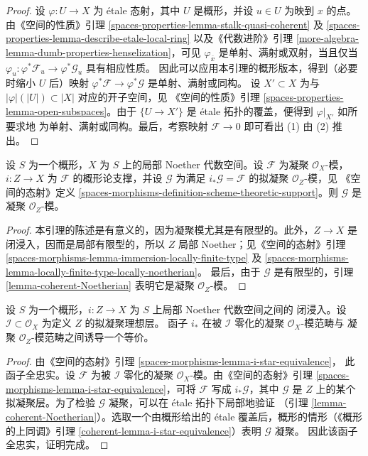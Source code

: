 \begin{proof}
设 $\varphi : U \to X$ 为 \'etale 态射，其中 $U$ 是概形，并设 $u \in U$
为映到 $x$ 的点。由《空间的性质》引理
\ref{spaces-properties-lemma-stalk-quasi-coherent} 及
\ref{spaces-properties-lemma-describe-etale-local-ring}
以及《代数进阶》引理
\ref{more-algebra-lemma-dumb-properties-henselization}，可见
$\varphi_{\overline{x}}$ 是单射、满射或双射，当且仅当
$\varphi_u : \varphi^*\mathcal{F}_u \to \varphi^*\mathcal{G}_u$
具有相应性质。%
因此可以应用本引理的概形版本，得到（必要时缩小 $U$ 后）映射
$\varphi^*\mathcal{F} \to \varphi^*\mathcal{G}$ 是单射、满射或同构。
设 $X' \subset X$ 为与 $|\varphi|(|U|) \subset |X|$ 对应的开子空间，见
《空间的性质》引理 \ref{spaces-properties-lemma-open-subspaces}。由于
$\{U \to X'\}$ 是 \'etale 拓扑的覆盖，便得到 $\varphi|_{X'}$ 如所要求地
为单射、满射或同构。最后，考察映射 $\mathcal{F} \to 0$ 即可看出 (1)
由 (2) 推出。
\end{proof}

\begin{lemma}
\label{lemma-coherent-support-closed}
设 $S$ 为一个概形，$X$ 为 $S$ 上的局部 Noether 代数空间。设
$\mathcal{F}$ 为凝聚 $\mathcal{O}_X$-模，$i : Z \to X$ 为
$\mathcal{F}$ 的概形论支撑，并设 $\mathcal{G}$ 为满足
$i_*\mathcal{G} = \mathcal{F}$ 的拟凝聚 $\mathcal{O}_Z$-模，见
《空间的态射》定义
\ref{spaces-morphisms-definition-scheme-theoretic-support}。则
$\mathcal{G}$ 是凝聚 $\mathcal{O}_Z$-模。
\end{lemma}

\begin{proof}
本引理的陈述是有意义的，因为凝聚模尤其是有限型的。此外，$Z \to X$
是闭浸入，因而是局部有限型的，所以 $Z$ 局部 Noether；见《空间的态射》引理
\ref{spaces-morphisms-lemma-immersion-locally-finite-type} 及
\ref{spaces-morphisms-lemma-locally-finite-type-locally-noetherian}。
最后，由于 $\mathcal{G}$ 是有限型的，引理
\ref{lemma-coherent-Noetherian} 表明它是凝聚 $\mathcal{O}_Z$-模。
\end{proof}

\begin{lemma}
\label{lemma-i-star-equivalence}
设 $S$ 为一个概形，$i : Z \to X$ 为 $S$ 上局部 Noether 代数空间之间的
闭浸入。设 $\mathcal{I} \subset \mathcal{O}_X$ 为定义 $Z$ 的拟凝聚理想层。
函子 $i_*$ 在被 $\mathcal{I}$ 零化的凝聚 $\mathcal{O}_X$-模范畴与
凝聚 $\mathcal{O}_Z$-模范畴之间诱导一个等价。
\end{lemma}

\begin{proof}
由《空间的态射》引理 \ref{spaces-morphisms-lemma-i-star-equivalence}，
此函子全忠实。设 $\mathcal{F}$ 为被 $\mathcal{I}$ 零化的凝聚
$\mathcal{O}_X$-模。由《空间的态射》引理
\ref{spaces-morphisms-lemma-i-star-equivalence}，可将
$\mathcal{F}$ 写成 $i_*\mathcal{G}$，其中 $\mathcal{G}$ 是 $Z$ 上的某个
拟凝聚层。为了检验 $\mathcal{G}$ 凝聚，可以在 \'etale 拓扑下局部地验证
（引理 \ref{lemma-coherent-Noetherian}）。选取一个由概形给出的 \'etale
覆盖后，概形的情形（《概形的上同调》引理
\ref{coherent-lemma-i-star-equivalence}）表明 $\mathcal{G}$ 凝聚。
因此该函子全忠实，证明完成。%
\end{proof}

